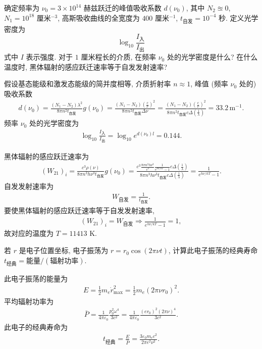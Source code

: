 \documentclass[twoside]{note}
\begin{document}
\begin{exe}
    确定频率为 $\nu_0=3\times 10^{14}$ 赫兹跃迁的峰值吸收系数 $d(\nu_0)$, 其中 $N_2\approxeq 0$, $N_1=10^{18}$ 厘米${}^{-3}$, 高斯吸收曲线的全宽度为 $400$ 厘米${}^{-1}$, $t_{\text{自发}}=10^{-4}$ 秒. 定义光学密度为
    \[
        \log_{10}\frac{I_{\text{入}}}{I_{\text{出}}}
    \]
    式中 $I$ 表示强度. 对于 $1$ 厘米程长的介质, 在频率 $\nu_0$ 处的光学密度是什么? 在什么温度时, 黑体辐射的感应跃迁速率等于自发发射速率?
\end{exe}
\begin{sol}
    假设基态能级和激发态能级的简并度相等, 介质折射率 $n\approx 1$, 峰值 (频率 $\nu_0$ 处的) 吸收系数
    \begin{align}
        d(\nu_0)=\frac{(N_1-N_2)\lambda^2}{8\pi n^2t_{\text{自发}}}g(\nu_0)=\frac{(N_1-N_2)\left(\frac{c}{\nu}\right)^2}{8\pi n^2t_{\text{自发}}\Delta\nu}=\frac{(N_1-N_2)\left(\frac{c}{\nu}\right)^2}{8\pi n^2t_{\text{自发}}c\Delta\left(\frac{1}{\lambda}\right)}=33.2\,\text{m}^{-1}.
    \end{align}
    频率 $\nu_0$ 处的光学密度为
    \begin{align}
        \log_{10}\frac{I_{\text{入}}}{I_{\text{出}}}=\log_{10}e^{d(\nu_0)l}=0.144.
    \end{align}

    黑体辐射的感应跃迁速率为
    \begin{align}
        (W_{21})_i=\frac{c^3\rho(\nu)}{8\pi n^3h\nu^3t_{\text{自发}}}g(\nu_0)=\frac{c^3\frac{8\pi n^3h\nu^3}{c^3}\frac{1}{e^{h\nu/kT}-1}c\Delta\left(\frac{1}{\lambda}\right)}{8\pi n^3h\nu^3t_{\text{自发}}c\Delta\left(\frac{1}{\lambda}\right)}=\frac{1}{e^{h\nu/kT}-1}.
    \end{align}
    自发发射速率为
    \begin{align}
        W_{\text{自发}}=\frac{1}{t_{\text{自发}}}.
    \end{align}
    要使黑体辐射的感应跃迁速率等于自发发射速率,
    \begin{align}
        (W_{21})_i=W_{\text{自发}}\Longrightarrow\frac{1}{e^{h\nu/kT}-1}=1,
    \end{align}
    故对应的温度为 $T=11413$ K.
\end{sol}

\begin{exe}
    若 $r$ 是电子位置坐标, 电子振荡为 $r=r_0\cos(2\pi\nu t)$, 计算此电子振荡的经典寿命 $t_{\text{经典}}=\text{能量}/(\text{辐射功率})$.
\end{exe}
\begin{sol}
    此电子振荡的能量为
    \begin{align}
        E=\frac{1}{2}m_e\dot{r}_{\max}^2=\frac{1}{2}m_e(2\pi\nu r_0)^2.
    \end{align}
    平均辐射功率为
    \begin{align}
        \bar{P}=\frac{1}{4\pi\varepsilon_0}\frac{p_0^2\omega^4}{3c^2}=\frac{1}{4\pi\varepsilon_0}\frac{(er_0)^2(2\pi\nu)^4}{3c^2}.
    \end{align}
    此电子的经典寿命为
    \begin{align}
        t_{\text{经典}}=\frac{E}{\bar{P}}=\frac{3\varepsilon_0m_ec^2}{2\pi e^2\nu^2}.
    \end{align}
\end{sol}
\end{document}
